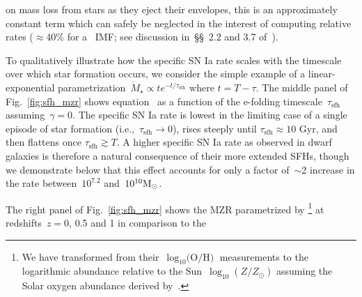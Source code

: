 \documentclass[foo.tex]{subfiles}
\begin{document}
on mass loss from stars as they eject their envelopes, this is an approximately
constant term which can safely be neglected in the interest of computing
relative rates ($\approx$40\% for a~\citealt{Kroupa2001} IMF; see discussion
in~\S\S~2.2 and 3.7 of~\citealt*{Weinberg2017}).
\par
To qualitatively illustrate how the specific SN Ia rate scales with the
timescale over which star formation occurs, we consider the simple example of a
linear-exponential
parametrization~$\dot{M}_\star \propto te^{-t/\tau_\text{sfh}}$ where
$t = T - \tau$.
The middle panel of Fig.~\ref{fig:sfh_mzr} shows equation~ as
a function of the e-folding timescale~$\tau_\text{sfh}$ assuming~$\gamma = 0$.
The specific SN Ia rate is lowest in the limiting case of a single episode of
star formation (i.e.,~$\tau_\text{sfh} \rightarrow 0$), rises steeply until
$\tau_\text{sfh} \approx 10$ Gyr, and then flattens once
$\tau_\text{sfh} \gtrsim T$.
A higher specific SN Ia rate as observed in dwarf galaxies is therefore a
natural consequence of their more extended SFHs, though we demonstrate below
that this effect accounts for only a factor of~$\sim$2 increase in the rate
between~$10^{7.2}$ and~$10^{10} \text{M}_\odot$.
\par
The right panel of Fig.~\ref{fig:sfh_mzr} shows the MZR parametrized by
\citet[][see their equation 5]{Zahid2014}\footnote{
	We have transformed from their~$\log_{10}\text{(O/H)}$ measurements to the
	logarithmic abundance relative to the Sun~$\log_{10}(Z / Z_\odot)$ assuming
	the Solar oxygen abundance derived by~\citet{Asplund2009}.
} at redshifts~$z = 0$, 0.5 and 1 in comparison to the~\citet{Andrews2013}
\end{document}
